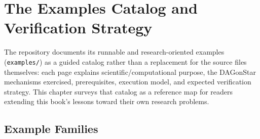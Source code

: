\chapter{The Examples Catalog and Verification Strategy}
\label{ch:examples-catalog}

The repository documents its runnable and research-oriented examples
(\texttt{examples/}) as a guided catalog rather than a replacement for the
source files themselves: each page explains scientific/computational
purpose, the DAGonStar mechanisms exercised, prerequisites, execution model,
and expected verification strategy. This chapter surveys that catalog as a
reference map for readers extending this book's lessons toward their own
research problems.

\section{Example Families}

